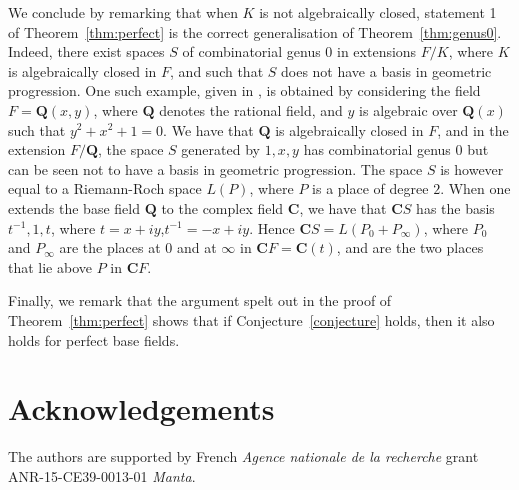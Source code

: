 \documentclass{article}
\theoremstyle{plain}
\theoremstyle{definition}
\theoremstyle{remark}
\def\Q{{\mathbf Q}}
\def\C{{\mathbf C}}
\begin{document}
{
We conclude by remarking that when $K$ is not algebraically closed, statement 1 of
Theorem~\ref{thm:perfect} is the correct generalisation of
Theorem~\ref{thm:genus0}. Indeed, there exist spaces $S$ of combinatorial
genus $0$ in extensions $F/K$, where $K$ is algebraically closed in
$F$, and such that $S$ does not have a basis in geometric
progression. One such example, given in \cite{bszVosper}, is obtained
by considering the field $F=\Q(x,y)$, where $\Q$ denotes the rational
field, and $y$ is algebraic over
$\Q(x)$ such that $y^2+x^2+1=0$. We have that $\Q$ is
algebraically closed in $F$, and in the extension $F/\Q$, the space
$S$ generated by $1,x,y$ has combinatorial genus $0$ but can be seen
not to have a basis in geometric progression. The space $S$ is however
equal to a Riemann-Roch space $L(P)$, where $P$ is a place of degree
$2$. When one extends the base field $\Q$ to the complex field $\C$, 
we have that $\C S$ has the basis $t^{-1},1,t$, where
$t=x+iy$,$t^{-1}=-x+iy$. Hence $\C S= L(P_0+P_{\infty})$, where $P_0$
and $P_\infty$ are the places at $0$ and at $\infty$ in $\C F=\C(t)$,
and are the two places that lie above $P$ in $\C F$.
}

{Finally, we remark that the argument spelt out in the
proof of Theorem~\ref{thm:perfect} shows that if
Conjecture~\ref{conjecture} holds, then it also holds for perfect
base fields.}

\section*{Acknowledgements}
The authors are supported by French {\em Agence nationale de la recherche} grant ANR-15-CE39-0013-01 {\em Manta}.




\end{document}
